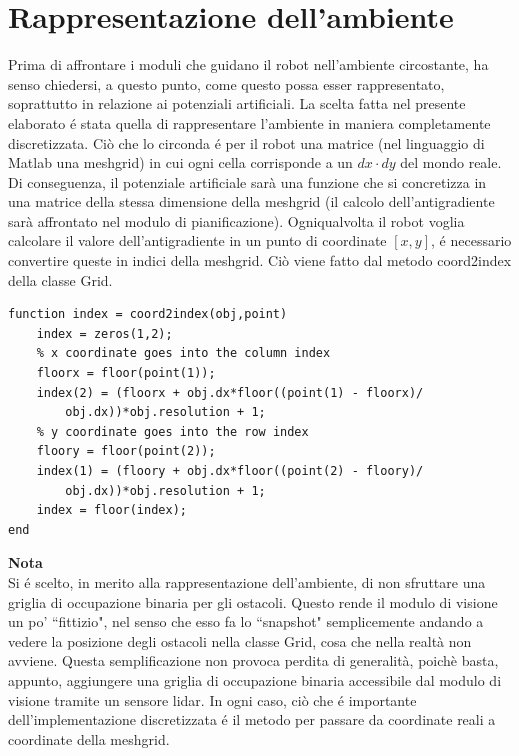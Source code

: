 \documentclass[14pt,a4paper]{extarticle}
\begin{document}
\section{Rappresentazione dell'ambiente}
Prima di affrontare i moduli che guidano il robot nell'ambiente circostante, ha senso chiedersi, a questo punto, come questo possa esser rappresentato, soprattutto in relazione ai potenziali artificiali. La scelta fatta nel presente elaborato é stata quella di rappresentare l'ambiente in maniera completamente discretizzata. Ciò che lo circonda é per il robot una matrice (nel linguaggio di Matlab una meshgrid) in cui ogni cella corrisponde a un \(dx\cdot dy\) del mondo reale. Di conseguenza, il potenziale artificiale sarà una funzione che si concretizza in una matrice della stessa dimensione della meshgrid (il calcolo dell'antigradiente sarà affrontato nel modulo di pianificazione). Ogniqualvolta il robot voglia calcolare il valore dell'antigradiente in un punto di coordinate \([x,y]\), é necessario convertire queste in indici della meshgrid. Ciò viene fatto dal metodo coord2index della classe Grid.
\begin{lstlisting}[caption=Metodo che converte coordinate cartesiane in indici della meshgrid]
function index = coord2index(obj,point)
	index = zeros(1,2);
	% x coordinate goes into the column index
	floorx = floor(point(1));
	index(2) = (floorx + obj.dx*floor((point(1) - floorx)/
		obj.dx))*obj.resolution + 1;
	% y coordinate goes into the row index
	floory = floor(point(2));
	index(1) = (floory + obj.dx*floor((point(2) - floory)/
		obj.dx))*obj.resolution + 1;
	index = floor(index);
end
\end{lstlisting}

\begin{nota}
\textbf{Nota}\\ Si é scelto, in merito alla rappresentazione dell'ambiente, di non sfruttare una griglia di occupazione binaria per gli ostacoli. Questo rende il modulo di visione un po' ``fittizio", nel senso che esso fa lo ``snapshot" semplicemente andando a vedere la posizione degli ostacoli nella classe Grid, cosa che nella realtà non avviene. Questa semplificazione non provoca perdita di generalità, poichè basta, appunto, aggiungere una griglia di occupazione binaria accessibile dal modulo di visione tramite un sensore lidar. In ogni caso, ciò che é importante dell'implementazione discretizzata é il metodo per passare da coordinate reali a coordinate della meshgrid.
\end{nota}
\end{document}
